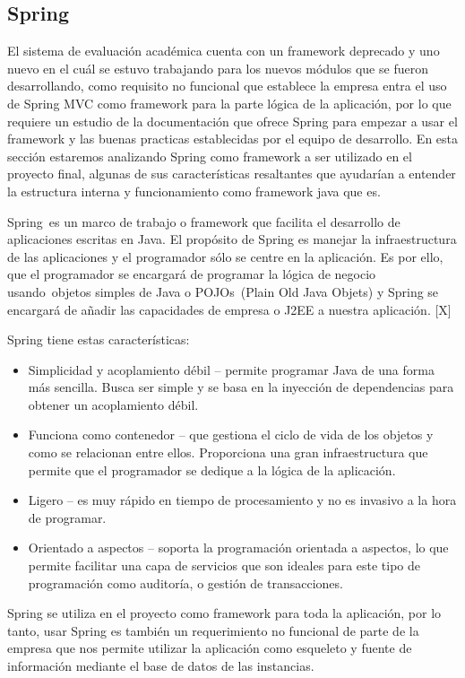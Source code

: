 \subsection{Spring}
El sistema de evaluación académica cuenta con un framework deprecado y uno nuevo en el cuál se estuvo trabajando para los nuevos módulos que se fueron desarrollando, como requisito no funcional que establece la empresa entra el uso de Spring MVC como framework para la parte lógica de la aplicación, por lo que requiere un estudio de la documentación que ofrece Spring para empezar a usar el framework y las buenas practicas establecidas por el equipo de desarrollo. En esta sección estaremos analizando Spring como framework a ser utilizado en el proyecto final, algunas de sus características resaltantes que ayudarían a entender la estructura interna y funcionamiento como framework java que es.

Spring es un marco de trabajo o framework que facilita el desarrollo de aplicaciones escritas en Java. El propósito de Spring es manejar la infraestructura de las aplicaciones y el programador sólo se centre en la aplicación. Es por ello, que el programador se encargará de programar la lógica de negocio usando objetos simples de Java o POJOs (Plain Old Java Objets) y Spring se encargará de añadir las capacidades de empresa o J2EE a nuestra aplicación. [X]

Spring tiene estas características:
\begin{itemize}
	\item Simplicidad y acoplamiento débil – permite programar Java de una forma más sencilla. Busca ser simple y se basa en la inyección de dependencias para obtener un acoplamiento débil.
	\item Funciona como contenedor – que gestiona el ciclo de vida de los objetos y como se relacionan entre ellos. Proporciona una gran infraestructura que permite que el programador se dedique a la lógica de la aplicación.
	\item Ligero – es muy rápido en tiempo de procesamiento y no es invasivo a la hora de programar.
	\item Orientado a aspectos – soporta la programación orientada a aspectos, lo que permite facilitar una capa de servicios que son ideales para este tipo de programación como auditoría, o gestión de transacciones.
\end{itemize} 

Spring se utiliza en el proyecto como framework para toda la aplicación, por lo tanto, usar Spring es también un requerimiento no funcional de parte de la empresa que nos permite utilizar la aplicación como esqueleto y fuente de información mediante el base de datos de las instancias.

